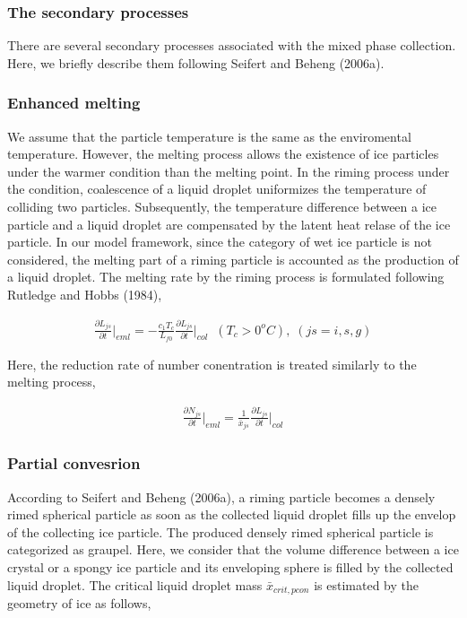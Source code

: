 \subsubsection{The secondary processes}
There are several secondary processes associated with the mixed phase collection. Here, we briefly describe them following Seifert and Beheng (2006a).

\subsubsection{Enhanced melting}
We assume that the particle temperature is the same as the enviromental temperature. However, the melting process allows the existence of ice particles under the warmer condition than the melting point. In the riming process under the condition, coalescence of a liquid droplet uniformizes the temperature of colliding two particles. Subsequently, the temperature difference between a ice particle and a liquid droplet are compensated by the latent heat relase of the ice particle. In our model framework, since the category of wet ice particle is not considered, the melting part of a riming particle is accounted as the production of a liquid droplet. The melting rate by the riming process is formulated following Rutledge and Hobbs (1984),

\begin{eqnarray}
\frac{\partial L_{js}}{\partial t}\Bigr|_{eml}=-\frac{c_{1}T_{c}}{L_{f0}}\frac{\partial L_{js}}{\partial t}\Bigr|_{col}\;\;(T_{c}>0^{o}C),\;(js=i,s,g)\label{sn205}
\end{eqnarray}

Here, the reduction rate of number conentration is treated similarly to the melting process,

\begin{eqnarray}
\frac{\partial N_{js}}{\partial t}\Bigr|_{eml}=\frac{1}{\bar{x}_{js}}\frac{\partial L_{js}}{\partial t}\Bigr|_{col}\label{sn206}
\end{eqnarray}

\subsubsection{Partial convesrion}
According to Seifert and Beheng (2006a), a riming particle becomes a densely rimed spherical particle as soon as the collected liquid droplet fills up the envelop of the collecting ice particle. The produced densely rimed spherical particle is categorized as graupel. Here, we consider that the volume difference between a ice crystal or a spongy ice particle and its enveloping sphere is filled by the collected liquid droplet. The critical liquid droplet mass $\bar{x}_{crit,pcon}$ is estimated by the geometry of ice as follows,

